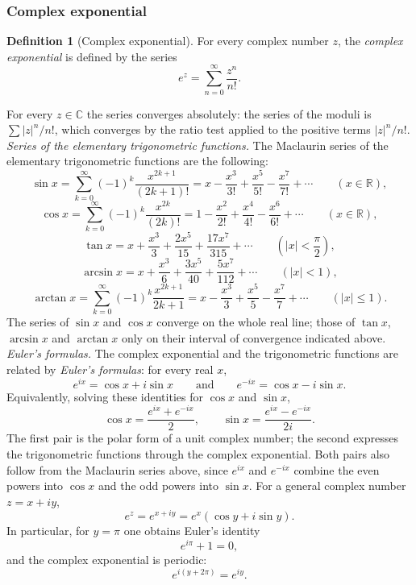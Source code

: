 \documentclass[11pt,a4paper]{article}
\theoremstyle{definition} \newtheorem{definition}{Definition} \theoremstyle{plain} \newtheorem{theorem}{Theorem}
\begin{document}
\subsubsection{Complex exponential}
\begin{definition}[Complex exponential] For every complex number $z$, the \emph{complex exponential} is defined by the series
\[ e^z = \sum_{n=0}^{\infty} \frac{z^n}{n!}. \] \end{definition}
For every $z\in\mathbb{C}$ the series converges absolutely: the series of the moduli is $\sum |z|^n/n!$, which converges by the ratio test applied to the positive terms $|z|^n/n!$.
\emph{Series of the elementary trigonometric functions.} The Maclaurin series of the elementary trigonometric functions are the following:
\[ \sin x = \sum_{k=0}^{\infty} (-1)^k \frac{x^{2k+1}}{(2k+1)!} = x - \frac{x^3}{3!} + \frac{x^5}{5!} - \frac{x^7}{7!} + \cdots \qquad (x\in\mathbb{R}), \]
\[ \cos x = \sum_{k=0}^{\infty} (-1)^k \frac{x^{2k}}{(2k)!} = 1 - \frac{x^2}{2!} + \frac{x^4}{4!} - \frac{x^6}{6!} + \cdots \qquad (x\in\mathbb{R}), \]
\[ \tan x = x + \frac{x^3}{3} + \frac{2x^5}{15} + \frac{17x^7}{315} + \cdots \qquad \left(|x| < \frac{\pi}{2}\right), \]
\[ \arcsin x = x + \frac{x^3}{6} + \frac{3x^5}{40} + \frac{5x^7}{112} + \cdots \qquad (|x| < 1), \]
\[ \arctan x = \sum_{k=0}^{\infty} (-1)^k \frac{x^{2k+1}}{2k+1} = x - \frac{x^3}{3} + \frac{x^5}{5} - \frac{x^7}{7} + \cdots \qquad (|x| \le 1). \]
The series of $\sin x$ and $\cos x$ converge on the whole real line; those of $\tan x$, $\arcsin x$ and $\arctan x$ only on their interval of convergence indicated above.
\emph{Euler's formulas.} The complex exponential and the trigonometric functions are related by \emph{Euler's formulas}: for every real $x$,
\[ e^{ix} = \cos x + i\sin x \qquad\text{and}\qquad e^{-ix} = \cos x - i\sin x. \]
Equivalently, solving these identities for $\cos x$ and $\sin x$,
\[ \cos x = \frac{e^{ix} + e^{-ix}}{2}, \qquad \sin x = \frac{e^{ix} - e^{-ix}}{2i}. \]
The first pair is the polar form of a unit complex number; the second expresses the trigonometric functions through the complex exponential. Both pairs also follow from the Maclaurin series above, since $e^{ix}$ and $e^{-ix}$ combine the even powers into $\cos x$ and the odd powers into $\sin x$.
For a general complex number $z = x + iy$,
\[ e^z = e^{x+iy} = e^x (\cos y + i\sin y). \]
In particular, for $y = \pi$ one obtains Euler's identity
\[ e^{i\pi} + 1 = 0, \]
and the complex exponential is periodic:
\[ e^{i(y + 2\pi)} = e^{iy}. \]
\end{document}
